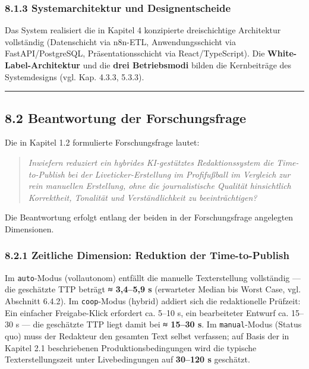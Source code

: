 \subsubsection{8.1.3 Systemarchitektur und
Designentscheide}\label{systemarchitektur-und-designentscheide}

Das System realisiert die in Kapitel 4 konzipierte dreischichtige
Architektur vollständig (Datenschicht via n8n-ETL, Anwendungsschicht via
FastAPI/PostgreSQL, Präsentationsschicht via React/TypeScript). Die
\textbf{White-Label-Architektur} und die \textbf{drei Betriebsmodi}
bilden die Kernbeiträge des Systemdesigns (vgl. Kap. 4.3.3, 5.3.3).

\begin{center}\rule{0.5\linewidth}{0.5pt}\end{center}

\subsection{8.2 Beantwortung der
Forschungsfrage}\label{beantwortung-der-forschungsfrage}

Die in Kapitel 1.2 formulierte Forschungsfrage lautet:

\begin{quote}
\emph{Inwiefern reduziert ein hybrides KI-gestütztes Redaktionssystem
die Time-to-Publish bei der Liveticker-Erstellung im Profifußball im
Vergleich zur rein manuellen Erstellung, ohne die journalistische
Qualität hinsichtlich Korrektheit, Tonalität und Verständlichkeit zu
beeinträchtigen?}
\end{quote}

Die Beantwortung erfolgt entlang der beiden in der Forschungsfrage
angelegten Dimensionen.

\subsubsection{8.2.1 Zeitliche Dimension: Reduktion der
Time-to-Publish}\label{zeitliche-dimension-reduktion-der-time-to-publish}

Im \passthrough{\lstinline!auto!}-Modus (vollautonom) entfällt die
manuelle Texterstellung vollständig --- die geschätzte TTP beträgt
\textbf{≈ 3,4--5,9 s} (erwarteter Median bis Worst Case, vgl. Abschnitt
6.4.2). Im \passthrough{\lstinline!coop!}-Modus (hybrid) addiert sich
die redaktionelle Prüfzeit: Ein einfacher Freigabe-Klick erfordert ca.
5--10 s, ein bearbeiteter Entwurf ca. 15--30 s --- die geschätzte TTP
liegt damit bei \textbf{≈ 15--30 s}. Im
\passthrough{\lstinline!manual!}-Modus (Status quo) muss der Redakteur
den gesamten Text selbst verfassen; auf Basis der in Kapitel 2.1
beschriebenen Produktionsbedingungen wird die typische
Texterstellungszeit unter Livebedingungen auf \textbf{30--120 s}
geschätzt.

